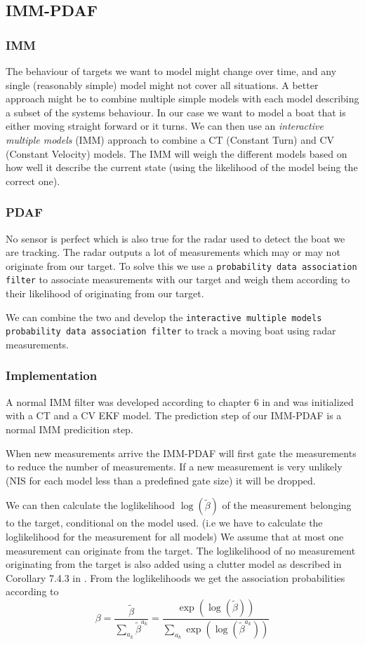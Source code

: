\subsection{IMM-PDAF}
\subsubsection{IMM}
The behaviour of targets we want to model might change over time, and any single (reasonably simple) model might not cover all situations. A better approach might be to combine multiple simple models with each model describing a subset of the systems behaviour. In our case we want to model a boat that is either moving straight forward or it turns. We can then use an \textit{interactive multiple models} (IMM) approach to combine a CT (Constant Turn) and CV (Constant Velocity) models. The IMM will weigh the different models based on how well it describe the current state (using the likelihood of the model being the correct one).

\subsubsection{PDAF}
No sensor is perfect which is also true for the radar used to detect the boat we are tracking. The radar outputs a lot of measurements which may or may not originate from our target. To solve this we use a \texttt{probability data association filter} to associate measurements with our target and weigh them according to their likelihood of originating from our target.

We can combine the two and develop the \texttt{interactive multiple models probability data association filter} to track a moving boat using radar measurements.

\subsubsection{Implementation}
A normal IMM filter was developed according to chapter 6 in \cite{edmund} and was initialized with a CT and a CV EKF model. The prediction step of our IMM-PDAF is a normal IMM predicition step. 

When new measurements arrive the IMM-PDAF will first gate the measurements to reduce the number of measurements. If a new measurement is very unlikely (NIS for each model less than a predefined gate size) it will be dropped.

We can then calculate the loglikelihood $\log(\tilde{\beta})$ of the measurement belonging to the target, conditional on the model used. (i.e we have to calculate the loglikelihood for the measurement for all models) We assume that at most one measurement can originate from the target. The loglikelihood of no measurement originating from the target is also added using a clutter model as described in Corollary 7.4.3 in \cite{edmund}. From the loglikelihoods we get the association probabilities according to 
\begin{equation}
\beta = \frac{\tilde{\beta}}{\sum_{a_k}{\tilde{\beta}^{a_k}}} = \frac{\exp(\log(\tilde{\beta}))}{\sum_{a_k} {\exp(\log(\tilde{\beta}^{a_k}))}} 
\end{equation}

